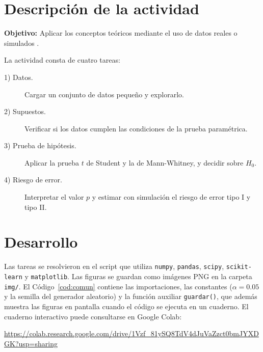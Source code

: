 \documentclass[11pt,letterpaper]{article}
\begin{document}
\section{Descripción de la actividad}

\textbf{Objetivo:} Aplicar los conceptos teóricos mediante el uso de datos reales o simulados \parencite{tecnm2026_documento_fuente}.

La actividad consta de cuatro tareas:

\begin{description}
    \item[1) Datos.] Cargar un conjunto de datos pequeño y explorarlo.
    \item[2) Supuestos.] Verificar si los datos cumplen las condiciones de la prueba paramétrica.
    \item[3) Prueba de hipótesis.] Aplicar la prueba $t$ de Student y la de Mann-Whitney, y decidir sobre $H_0$.
    \item[4) Riesgo de error.] Interpretar el valor $p$ y estimar con simulación el riesgo de error tipo I y tipo II.
\end{description}

\section{Desarrollo}

Las tareas se resolvieron en el script que utiliza \texttt{numpy}, \texttt{pandas}, \texttt{scipy}, \texttt{scikit-learn} y \texttt{matplotlib}. Las figuras se guardan como imágenes PNG en la carpeta \texttt{img/}. El Código~\ref{cod:comun} contiene las importaciones, las constantes ($\alpha = 0.05$ y la semilla del generador aleatorio) y la función auxiliar \texttt{guardar()}, que además muestra las figuras en pantalla cuando el código se ejecuta en un cuaderno. El cuaderno interactivo puede consultarse en Google Colab:

\begin{center}
    \url{https://colab.research.google.com/drive/1Vzf_81ySQ8TdV4dJuVaZzct0bmJYXDGK?usp=sharing}
\end{center}
\end{document}
